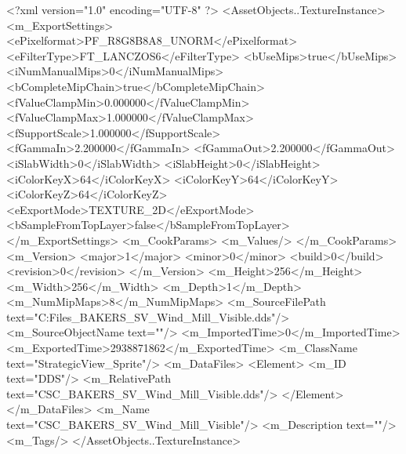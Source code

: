 <?xml version="1.0" encoding="UTF-8" ?>
<AssetObjects..TextureInstance>
	<m_ExportSettings>
		<ePixelformat>PF_R8G8B8A8_UNORM</ePixelformat>
		<eFilterType>FT_LANCZOS6</eFilterType>
		<bUseMips>true</bUseMips>
		<iNumManualMips>0</iNumManualMips>
		<bCompleteMipChain>true</bCompleteMipChain>
		<fValueClampMin>0.000000</fValueClampMin>
		<fValueClampMax>1.000000</fValueClampMax>
		<fSupportScale>1.000000</fSupportScale>
		<fGammaIn>2.200000</fGammaIn>
		<fGammaOut>2.200000</fGammaOut>
		<iSlabWidth>0</iSlabWidth>
		<iSlabHeight>0</iSlabHeight>
		<iColorKeyX>64</iColorKeyX>
		<iColorKeyY>64</iColorKeyY>
		<iColorKeyZ>64</iColorKeyZ>
		<eExportMode>TEXTURE_2D</eExportMode>
		<bSampleFromTopLayer>false</bSampleFromTopLayer>
	</m_ExportSettings>
	<m_CookParams>
		<m_Values/>
	</m_CookParams>
	<m_Version>
		<major>1</major>
		<minor>0</minor>
		<build>0</build>
		<revision>0</revision>
	</m_Version>
	<m_Height>256</m_Height>
	<m_Width>256</m_Width>
	<m_Depth>1</m_Depth>
	<m_NumMipMaps>8</m_NumMipMaps>
	<m_SourceFilePath text="C:\Users\Shadow\Desktop\Working Files\Icons\StrategicView\CSC_BAKERS_SV_Wind_Mill_Visible.dds"/>
	<m_SourceObjectName text=""/>
	<m_ImportedTime>0</m_ImportedTime>
	<m_ExportedTime>2938871862</m_ExportedTime>
	<m_ClassName text="StrategicView_Sprite"/>
	<m_DataFiles>
		<Element>
			<m_ID text="DDS"/>
			<m_RelativePath text="CSC_BAKERS_SV_Wind_Mill_Visible.dds"/>
		</Element>
	</m_DataFiles>
	<m_Name text="CSC_BAKERS_SV_Wind_Mill_Visible"/>
	<m_Description text=""/>
	<m_Tags/>
</AssetObjects..TextureInstance>

